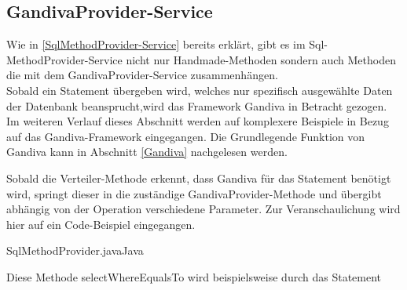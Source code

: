 \subsection{GandivaProvider-Service}

Wie in \ref{SqlMethodProvider-Service} bereits erklärt, gibt es im Sql-MethodProvider-Service nicht nur Handmade-Methoden sondern auch Methoden die mit dem GandivaProvider-Service zusammenhängen.
\\
Sobald ein Statement übergeben wird, welches nur spezifisch ausgewählte Daten der Datenbank beansprucht,wird das Framework Gandiva in Betracht gezogen.
Im weiteren Verlauf dieses Abschnitt werden auf komplexere Beispiele in Bezug auf das Gandiva-Framework eingegangen. Die Grundlegende Funktion von Gandiva kann in Abschnitt \ref{Gandiva} nachgelesen werden.

Sobald die Verteiler-Methode erkennt, dass Gandiva für das Statement benötigt wird, springt dieser in die zuständige GandivaProvider-Methode und übergibt abhängig von der Operation verschiedene Parameter. Zur Veranschaulichung wird hier auf ein Code-Beispiel eingegangen.

\begin{codeblock}{SqlMethodProvider.java}{Java}
  \begin{javacode}
    private IndexResponse selectWhereEqualsTo(String columnName, int value, Table table) throws GandivaException {

        Filter filter = gandivaProvider.equalsTo_NumberFilter(table,columnName,value);

        ArrowRecordBatch batch = gandivaProvider.createBatch(table,columnName);

        SelectionVectorInt32 selectionVectorInt32 = gandivaProvider.createSelectionVector(table);

        filter.evaluate(batch,selectionVectorInt32);

        int[] indices = MemoryUtil.selectionVectorToArray(selectionVectorInt32);

...

  \end{javacode}
\end{codeblock}

Diese Methode selectWhereEqualsTo wird beispielsweise durch das Statement

\begin{center}
\end{center}

